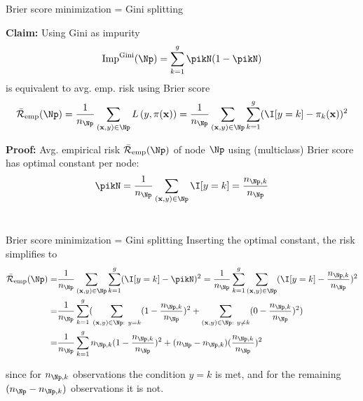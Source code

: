 \documentclass[11pt,compress,t,notes=noshow, xcolor=table]{beamer}
\begin{document}
\begin{frame}{Brier score minimization = Gini splitting}

\textbf{Claim:} Using Gini as impurity
$$\text{Imp}^{\text{Gini}}(\Np) = \sum_{k=1}^g \pikN (1-\pikN )$$
is equivalent to avg. emp. risk using Brier score 
$$\riskeb(\Np)= \frac{1}{n_\Np} \sum_{\xy \in \Np} \Lpixy = \frac{1}{n_\Np} \sum_{\xy \in \Np} \sum_{k = 1}^g (\I [y=k] - \pi_k(\xv))^2$$



\vfill

\textbf{Proof:} Avg. empirical risk $\riskeb(\Np)$ of node $\Np$ using (multiclass) Brier score has optimal constant per node: 
$$\pikN = \frac{1}{n_{\Np}} \sum\limits_{(\xv,y) \in \Np} \I [y=k] = \frac{n_{\Np,k}}{n_{\Np }}$$ \\

\vfill



\end{frame}
\begin{frame2}[small]{Brier score minimization = Gini splitting}
Inserting the optimal constant, the risk simplifies to
\begin{align*}
\riskeb(\Np) =& \frac{1}{n_\Np} \sum_{\xy \in \Np}  \sum_{k = 1}^g (\I [y=k] - \pikN)^2 
= \frac{1}{n_\Np} \sum_{k = 1}^g \sum_{\xy \in \Np} (\I [y=k] - \frac{n_{\Np,k}}{n_{\Np }})^2\\
=& \frac{1}{n_\Np} \sum_{k = 1}^{g} (\sum_{\xy \in \Np: ~ y = k} (1 - \frac{n_{\Np,k}}{n_{\Np }})^2 + \sum_{\xy \in \Np: ~ y \ne k} (0 - \frac{n_{\Np,k}}{n_{\Np }})^2) \\
=& \frac{1}{n_\Np} \sum_{k = 1}^g n_{\Np,k}(1 - \frac{n_{\Np,k}}{n_{\Np }})^2 + (n_{\Np } - n_{\Np,k})(\frac{n_{\Np,k}}{n_{\Np }})^2
\end{align*}

\vfill

since for $n_{\Np,k}$ observations the condition $y = k$ is met, and for the remaining $(n_\Np - n_{\Np,k})$ observations it is not. 

\end{frame2}
\end{document}
